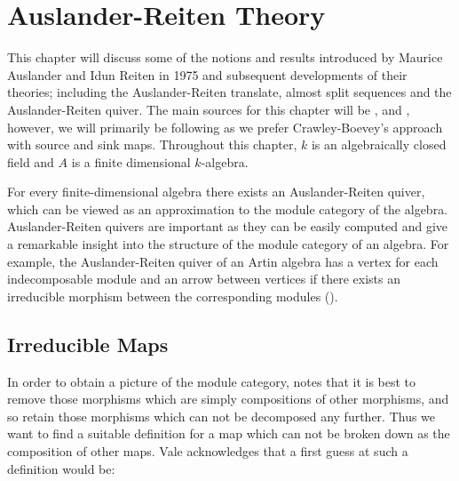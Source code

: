 \documentclass[11.5pt, twoside, a4paper, titlepage]{report}
\theoremstyle{definition}
\theoremstyle{plain}
\begin{document}


\chapter{Auslander-Reiten Theory}
This chapter will discuss some of the notions and results introduced by Maurice Auslander and Idun Reiten in 1975 and subsequent developments of their theories; including the Auslander-Reiten translate, almost split sequences and the Auslander-Reiten quiver. The main sources for this chapter will be \cite{CB3}, \cite{Vale} and \cite{Assem}, however, we will primarily be following \cite{CB3} as we prefer Crawley-Boevey's approach with source and sink maps. Throughout this chapter, $k$ is an algebraically closed field and $A$ is a finite dimensional $k$-algebra.
\vspace{0.5em}

For every finite-dimensional algebra there exists an Auslander-Reiten quiver, which can be viewed as an approximation to the module category of the algebra. Auslander-Reiten quivers are important as they can be easily computed and give a remarkable insight into the structure of the module category of an algebra. For example, the Auslander-Reiten quiver of an Artin algebra has a vertex for each indecomposable module and an arrow between vertices if there exists an irreducible morphism between the corresponding modules (\cite{AR}).

\section{Irreducible Maps}
In order to obtain a picture of the module category, \cite{Vale} notes that it is best to remove those morphisms which are simply compositions of other morphisms, and so retain those morphisms which can not be decomposed any further. Thus we want to find a suitable definition for a map which can not be broken down as the composition of other maps. Vale acknowledges that a first guess at such a definition would be:
\end{document}
